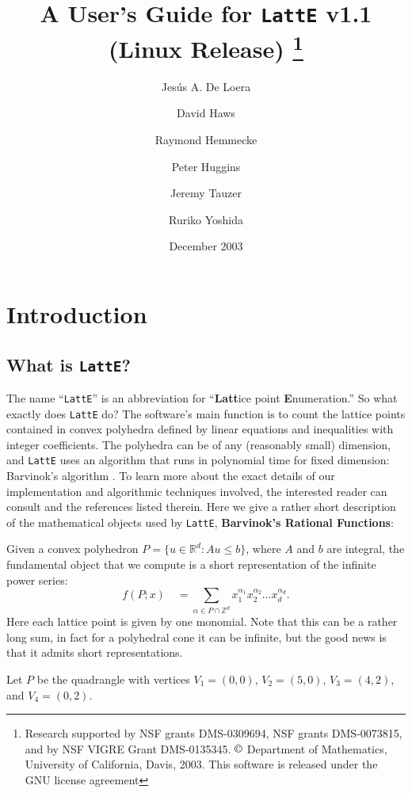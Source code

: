 \documentclass{article}
\title{A User's Guide for {\tt LattE} v1.1 \\ (Linux Release)
\footnote{Research supported by NSF grants DMS-0309694, NSF grants
DMS-0073815, and by NSF VIGRE Grant DMS-0135345. $\copyright$ 
Department of Mathematics, University of California, Davis, 2003. This
software is released under the GNU license agreement}}
\author{Jes\'us A. De Loera \and
        David Haws \and
        Raymond Hemmecke \and
        Peter Huggins \and 
        Jeremy Tauzer \and 
        Ruriko Yoshida }
\date{December 2003}
\newcommand{\Z}{{\mathbb Z}}
\newcommand{\R}{{\mathbb R}}
\begin{document}
\maketitle{}

\newpage

\tableofcontents

\newpage

\section{Introduction}

\subsection{What is {\tt LattE}?} \label{intro}

The name ``{\tt LattE}'' is an abbreviation for ``{\bf Latt}ice point 
{\bf E}numeration.'' So what exactly does {\tt LattE} do? The 
software's main function is to count the lattice points contained in 
convex polyhedra defined by linear equations and inequalities with 
integer coefficients. The polyhedra can be of any (reasonably small) 
dimension, and {\tt LattE} uses an algorithm that runs in polynomial
time for fixed dimension: Barvinok's algorithm \cite{BarviPom}. To
learn more about the exact details of our implementation and
algorithmic techniques involved, the interested reader can consult 
\cite{latte1,latte2,latte3} and the references listed therein. Here we
give a rather short description of the mathematical objects used by
{\tt LattE}, {\bf Barvinok's Rational Functions}:

\noindent
Given a convex polyhedron $P = \{u\in\R^d:Au\leq b\}$, where $A$ and
$b$ are integral, the fundamental object that we compute is a short 
representation of the infinite power series:
\[
f(P;x) \quad = \sum_{\alpha\in P\cap\Z^d} x_1^{\alpha_1}
x_2^{\alpha_2} \ldots x_d^{\alpha_d}.
\]
Here each lattice point is given by one monomial. Note that this can be 
a rather long sum, in fact for a polyhedral cone it can be infinite, but 
the good news is that it admits short representations.

 Let $P$ be the quadrangle with vertices 
$V_1=(0,0)$, $V_2=(5,0)$, $V_3=(4,2)$, and $V_4=(0,2)$. 
\end{document}
